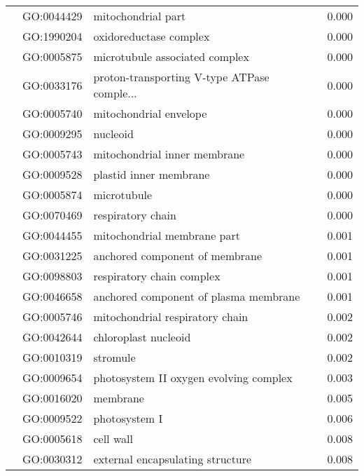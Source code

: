 \begin{longtable}{lllr}
   & GO:0044429 &                           mitochondrial part &         0.000 \\
   & GO:1990204 &                       oxidoreductase complex &         0.000 \\
   & GO:0005875 &               microtubule associated complex &         0.000 \\
   & GO:0033176 &  proton-transporting V-type ATPase comple... &         0.000 \\
   & GO:0005740 &                       mitochondrial envelope &         0.000 \\
   & GO:0009295 &                                     nucleoid &         0.000 \\
   & GO:0005743 &                 mitochondrial inner membrane &         0.000 \\
   & GO:0009528 &                       plastid inner membrane &         0.000 \\
   & GO:0005874 &                                  microtubule &         0.000 \\
   & GO:0070469 &                            respiratory chain &         0.000 \\
   & GO:0044455 &                  mitochondrial membrane part &         0.001 \\
   & GO:0031225 &               anchored component of membrane &         0.001 \\
   & GO:0098803 &                    respiratory chain complex &         0.001 \\
   & GO:0046658 &        anchored component of plasma membrane &         0.001 \\
   & GO:0005746 &              mitochondrial respiratory chain &         0.002 \\
   & GO:0042644 &                         chloroplast nucleoid &         0.002 \\
   & GO:0010319 &                                     stromule &         0.002 \\
   & GO:0009654 &       photosystem II oxygen evolving complex &         0.003 \\
   & GO:0016020 &                                     membrane &         0.005 \\
   & GO:0009522 &                                photosystem I &         0.006 \\
   & GO:0005618 &                                    cell wall &         0.008 \\
   & GO:0030312 &             external encapsulating structure &         0.008 \\

\end{longtable}

